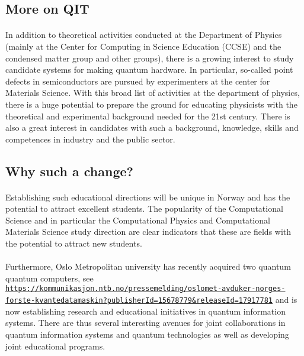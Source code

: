 \documentclass[%
oneside,                 %
final,                   %
10pt]{article}
\begin{document}
\subsection*{More on QIT}


\paragraph{}
In addition to theoretical activities conducted at the
Department of Physics (mainly at the Center for Computing in Science
Education (CCSE) and the condensed matter group and other groups), there is a growing
interest to study candidate systems for making quantum hardware. In
particular, so-called point defects in semiconductors are pursued by
experimenters at the center for Materials Science.  With this broad
list of activities at the department of physics, there is a huge
potential to prepare the ground for educating physicists with the
theoretical and experimental background needed for the 21st
century. There is also a great interest in candidates with such a
background, knowledge, skills and competences in industry and the
public sector.



\subsection*{Why such a change?}


\paragraph{}
Establishing such educational directions will be
unique in Norway and has the potential to attract excellent students.
The popularity of the Computational Science and in particular the Computational Physics and Computational Materials Science study direction are clear indicators that these are fields with the potential to attract new students.




\paragraph{}
Furthermore,
Oslo Metropolitan university  has recently acquired two quantum quantum computers, see \href{{https://kommunikasjon.ntb.no/pressemelding/oslomet-avduker-norges-forste-kvantedatamaskin?publisherId=15678779&releaseId=17917781}}{\nolinkurl{https://kommunikasjon.ntb.no/pressemelding/oslomet-avduker-norges-forste-kvantedatamaskin?publisherId=15678779&releaseId=17917781}} and is now establishing research and educational initiatives in quantum information systems. There are thus several interesting avenues for joint collaborations in quantum information systems and quantum technologies as well as developing joint educational programs.
\end{document}
